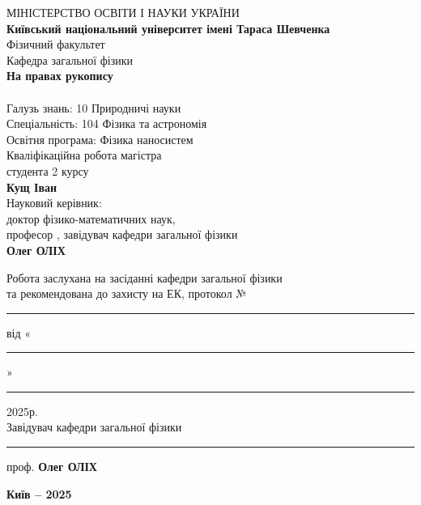 \documentclass[14pt,a4paper,titlepage,oneside]{book}
\numberwithin{equation}{part}
\begin{document}

\renewcommand\bibname{Список використаних джерел}
\renewcommand{\tablename}{Табл.}

\thispagestyle{empty}

\begin{titlepage}
\begin{center}
  \large
  МІНІСТЕРСТВО ОСВІТИ І НАУКИ УКРАЇНИ\\
  \textbf{Київський національний університет імені Тараса Шевченка}\\
  Фізичний факультет\\
  Кафедра загальної фізики\\[5mm]
  \flushright
  \textbf{На правах рукопису}\\[10mm]
  \centering
  {\LARGE
  \textbf{}
    }\\[15mm]
  
  \flushleft
  \large
  Галузь знань: 10 Природничі науки\\
  Спеціальність: 104 Фізика та астрономія\\
  Освітня програма: Фізика наносистем \\[5mm]
  
  \flushright
  Кваліфікаційна робота магістра\\
  студента 2 курсу\\
  \textbf{Кущ Іван}\\[5mm]
  Науковий керівник:\\
  доктор фізико-математичних наук,\\
  професор , завідувач кафедри загальної фізики\\
  \textbf{Олег ОЛІХ}\\[5mm]
  
  \vfill
  \begin{center}
    Робота заслухана на засіданні кафедри загальної фізики\\
      та рекомендована до захисту на ЕК, протокол №\rule{2cm}{0.4pt} від «\rule{1cm}{0.4pt}» \rule{4cm}{0.4pt} 2025р.\\[5mm]
      
      Завідувач кафедри загальної фізики  \rule{1,5cm}{0.4pt}  проф. \textbf{Олег ОЛІХ}\\[10mm]
  \end{center}
  
  \vfill
  \centering
  \textbf{Київ -- 2025}
\end{center}
\end{titlepage}
  
\end{document}
